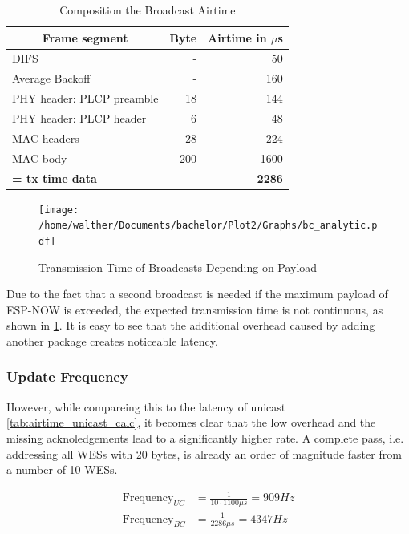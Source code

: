 \begin{table}[h]
	\centering
	\begin{tabular} { lrr }
		\toprule
		\multicolumn{1}{c}{Frame segment}
		& \multicolumn{1}{c}{Byte}
		& \multicolumn{1}{c}{Airtime in $\mu$s} \\
		\midrule
		DIFS								& -		& 50 \\
		Average Backoff						& -		& 160 \\
		PHY header: PLCP preamble			& 18	& 144 \\
		PHY header: PLCP header				& 6 	& 48 \\
		MAC headers							& 28	& 224 \\
		MAC body							& 200 	& 1600 \\
		\textbf{= tx time data}				& 		& \textbf{2286} \\
		\bottomrule
	\end{tabular}
	\caption{Composition the Broadcast Airtime}
	\label{tab:airtime_broadcast_calc}
\end{table}

\begin{figure}[h]
	\centering
	\texttt{[image: /home/walther/Documents/bachelor/Plot2/Graphs/bc\_analytic.pdf]}
	\caption{Transmission Time of Broadcasts Depending on Payload}
	\label{fig:bc_analytic}
\end{figure}

Due to the fact that a second broadcast is needed if the maximum payload of ESP-NOW is exceeded,
the expected transmission time is not continuous, as shown in \cref{fig:bc_analytic}.
It is easy to see that the additional overhead caused by adding another package creates noticeable latency.

\subsubsection*{Update Frequency}

However, while compareing this to the latency of unicast \ref{tab:airtime_unicast_calc},
it becomes clear that the low overhead and the missing acknoledgements lead to a significantly higher rate.
A complete pass, i.e. addressing all WESs with 20 bytes, is already an order of magnitude faster from a number of 10 WESs.

\begin{align}
	\text{Frequency}_{UC} &= \frac{1}{10 \cdot 1100\mu s} = 909 Hz \\
	\text{Frequency}_{BC} &= \frac{1}{2286\mu s} = 4347 Hz
\end{align}

